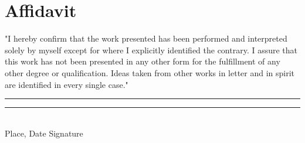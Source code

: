 \section*{Affidavit}
\vspace*{1.0cm}
"I  hereby confirm that the  work  presented  has  been  performed  and interpreted solely by myself except for where I explicitly identified the contrary. I assure that this work has not been presented in any other form for the fulfillment of any other degree or qualification. Ideas taken from other works in letter and in spirit are identified in every single case."\\
\newline
\newline
\newline

\noindent

\rule{5.5cm}{0.4pt} \phantom{ssssssssssssssssspace} \rule{5.5cm}{0.4pt}\\
\phantom{space}Place, Date \phantom{sssssssssssssssssssssssssssssssssssssspace} Signature
